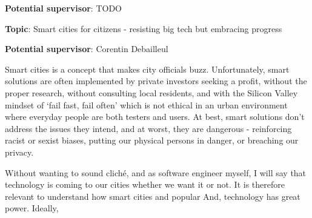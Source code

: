 \documentclass{article}
\begin{document}
\textbf{Potential supervisor}: TODO


\textbf{Topic}: Smart cities for citizens - resisting big tech but embracing progress

\textbf{Potential supervisor}: Corentin Debailleul

Smart cities is a concept that makes city officials buzz. Unfortunately, smart solutions are often implemented by private investors seeking a profit, without the proper research, without consulting local residents, and with the Silicon Valley mindset of `fail fast, fail often' which is not ethical in an urban environment where everyday people are both testers and users. At best, smart solutions don't address the issues they intend, and at worst, they are dangerous - reinforcing racist or sexist biases, putting our physical persons in danger, or breaching our privacy. 

Without wanting to sound cliché, and as software engineer myself, I will say that technology is coming to our cities whether we want it or not. 
It is therefore relevant to understand how smart cities and popular 
And, technology has great power. Ideally, 
\end{document}
